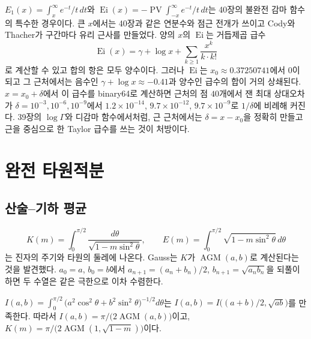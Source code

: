  $E_1(x)=\int_x^\infty e^{-t}/t\,dt$와 $\operatorname{Ei}(x)=-\operatorname{PV}\!\int_{-x}^\infty e^{-t}/t\,dt$는 40장의 불완전 감마 함수의 특수한 경우이다. 큰 $x$에서는 40장과 같은 연분수와 점근 전개가 쓰이고 Cody와 Thacher가 구간마다 유리 근사를 만들었다\cite{cody1968e1}. 양의 $x$의 $\operatorname{Ei}$는 거듭제곱 급수
\[
\operatorname{Ei}(x)=\gamma+\log x+\sum_{k\ge1}\frac{x^k}{k\cdot k!}
\]
로 계산할 수 있고 합의 항은 모두 양수이다. 그러나 $\operatorname{Ei}$는 $x_0\approx0.37250741$에서 $0$이 되고 그 근처에서는 음수인 $\gamma+\log x\approx-0.41$과 양수인 급수의 합이 거의 상쇄된다. $x=x_0+\delta$에서 이 급수를 binary64로 계산하면 근처의 점 $40$개에서 잰 최대 상대오차가 $\delta=10^{-3},10^{-6},10^{-9}$에서 $1.2\times10^{-14}$, $9.7\times10^{-12}$, $9.7\times10^{-9}$로 $1/\delta$에 비례해 커진다. 39장의 $\log\Gamma$와 디감마 함수에서처럼, 근 근처에서는 $\delta=x-x_0$을 정확히 만들고 근을 중심으로 한 Taylor 급수를 쓰는 것이 처방이다.

\section{완전 타원적분}
\label{sec:elliptic}

\subsection{산술--기하 평균}

\[
K(m)=\int_0^{\pi/2}\frac{d\theta}{\sqrt{1-m\sin^2\theta}},\qquad E(m)=\int_0^{\pi/2}\sqrt{1-m\sin^2\theta}\,d\theta
\]
는 진자의 주기와 타원의 둘레에 나온다. Gauss는 $K$가  $\operatorname{AGM}(a,b)$로 계산된다는 것을 발견했다. $a_0=a$, $b_0=b$에서 $a_{n+1}=(a_n+b_n)/2$, $b_{n+1}=\sqrt{a_nb_n}$을 되풀이하면 두 수열은 같은 극한으로 이차 수렴한다.

\begin{proposition}
\label{prop:agm-k}
$I(a,b)=\int_0^{\pi/2}\bigl(a^2\cos^2\theta+b^2\sin^2\theta\bigr)^{-1/2}d\theta$는 $I(a,b)=I\bigl((a+b)/2,\sqrt{ab}\bigr)$를 만족한다. 따라서 $I(a,b)=\pi/\bigl(2\operatorname{AGM}(a,b)\bigr)$이고, $K(m)=\pi/\bigl(2\operatorname{AGM}(1,\sqrt{1-m})\bigr)$이다.
\end{proposition}

